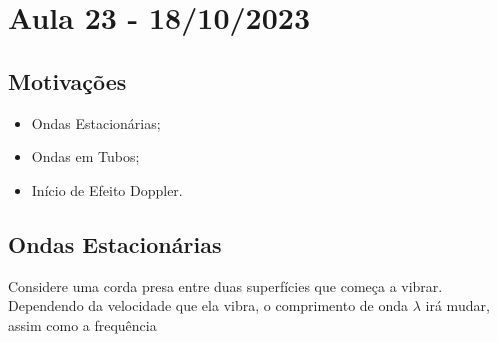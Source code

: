 \documentclass{article}
\begin{document}
\section{Aula 23 - 18/10/2023}
\subsection{Motivações}
\begin{itemize}
  \item Ondas Estacionárias;
  \item Ondas em Tubos;
  \item Início de Efeito Doppler.
\end{itemize}
\subsection{Ondas Estacionárias}
  Considere uma corda presa entre duas superfícies que começa a vibrar. Dependendo da velocidade que ela vibra,
o comprimento de onda \(\lambda \) irá mudar, assim como a frequência
\end{document}

